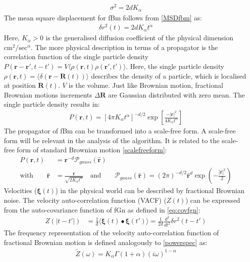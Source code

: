 \documentclass[
  a4paper,BCOR10mm,oneside,
  headsepline,footsepline,%
  fleqn,openbib
]{scrbook}
\begin{document}
\begin{align}
\label{diffusionvariance}
\sigma^2=2dK_{\alpha} 
\end{align}
The mean square displacement for fBm follows from \cref{MSDfbm} as:
\begin{align}
\delta r^{2}(t)=2dK_{\alpha} t^{\alpha}
\end{align}
Here,  $K_{\alpha}>0$  is the generalised diffusion coefficient of the physical dimension $ \mathrm{cm^2/sec^{\alpha}} $. The more physical description in terms of a propagator is the correlation function of the single particle density $P(\bm{r}-\bm{r}',t-t')= V\langle\rho(\bm{r},t) \rho(\bm{r}',t')\rangle$. Here, the single particle density $\rho(\bm{r},t)=\langle \delta(\bm{r}-\bm{R}(t))\rangle$ describes the density of a particle, which is localised at position $\bm{R}(t)$. $V$ is the volume. Just like Brownian motion, fractional Brownian motions increments $\Delta \bm{R}$ are Gaussian distributed with zero mean. The single particle density results in:
\begin{align}
 P(\bm{r},t)=[4 \pi K_{\alpha} t^{\alpha}]^{-d/2} \exp \left[ \frac{-|\bm{r}|^2}{ 4 K_{\alpha} t^{\alpha} }\right]
\end{align}
The propagator of fBm can be transformed into a scale-free form. A scale-free form will be relevant in the analysis of the algorithm. It is related to the scale-free form of standard Brownian motion \cref{scalefreeform}:
\begin{align}
P(\bm{r},t)&= \bm{r}^{-d} \mathcal{P}_{gauss}(\hat{\bm{r}}) \\ \text{with} \qquad \hat{\bm{r}} &= \frac{\bm{r}}{\sqrt{2 K_{\alpha} t^{\alpha}}}  \quad \text{and} \qquad \mathcal{P}_{gauss}(\bm{\hat{r}})= (2 \pi)^{-d/2}  \bm{\hat{r}}^d \exp \left(- \frac{|\bm{\hat{r}}|^2}{2} \right)\label{scalefreeformfrac}
\end{align}
Velocities ($\bm{\xi}(t)$) in the physical world can be described by fractional Brownian noise. The velocity auto-correlation function (VACF) ($Z(t)$) can be expressed from the auto-covariance function of fGn as defined in \cref{eq:covfgn}:
\begin{align}
Z(|t-t'|)&= \frac{1}{d}\langle \bm{\xi}(t) \bullet \bm{\xi}(t') \rangle = \frac{1}{2d} \frac{d^2}{dt^2} \delta r^2 (t-t')  
\end{align}
The frequency representation of the velocity auto-correlation function of fractional Brownian motion is defined analogously to \cref{powerspec} as:
\begin{align}
  \tilde{Z}(\omega) =  K_{\alpha} \Gamma(1+\alpha)(i \omega)^{1-\alpha}
\end{align}
\end{document}
